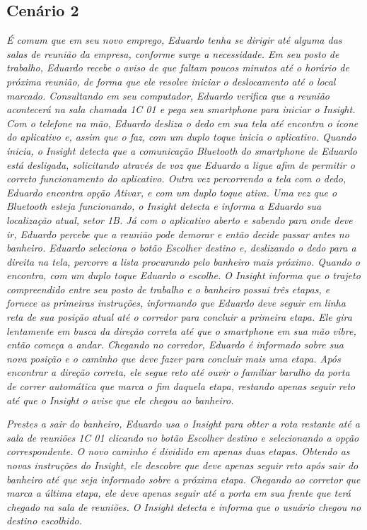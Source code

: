 \documentclass[twoside,english,brazilian]{UNISINOSartigo}
\begin{document}
\subsection{Cenário 2}
\textit{É comum que em seu novo emprego, Eduardo tenha se dirigir até alguma das salas de reunião da empresa, conforme surge a necessidade. Em seu posto de trabalho, Eduardo recebe o aviso de que faltam poucos minutos até o horário de próxima reunião, de forma que ele resolve iniciar o deslocamento até o local marcado. Consultando em seu computador, Eduardo verifica que a reunião acontecerá na sala chamada 1C 01 e pega seu smartphone para iniciar o Insight. Com o telefone na mão, Eduardo desliza o dedo em sua tela até encontra o ícone do aplicativo e, assim que o faz, com um duplo toque inicia o aplicativo. Quando inicia, o Insight detecta que a comunicação Bluetooth do smartphone de Eduardo está desligada, solicitando através de voz que Eduardo a ligue afim de permitir o correto funcionamento do aplicativo. Outra vez percorrendo a tela com o dedo, Eduardo encontra opção Ativar, e com um duplo toque ativa. Uma vez que o Bluetooth esteja funcionando, o Insight detecta e informa a Eduardo sua localização atual, setor 1B. Já com o aplicativo aberto e sabendo para onde deve ir, Eduardo percebe que a reunião pode demorar e então decide passar antes no banheiro. Eduardo seleciona o botão Escolher destino e, deslizando o dedo para a direita na tela, percorre a lista procurando pelo banheiro mais próximo. Quando o encontra, com um duplo toque Eduardo o escolhe. O Insight informa que o trajeto compreendido entre seu posto de trabalho e o banheiro possui três etapas, e fornece as primeiras instruções, informando que Eduardo deve seguir em linha reta de sua posição atual até o corredor para concluir a primeira etapa. Ele gira lentamente em busca da direção correta até que o smartphone em sua mão vibre, então começa a andar. Chegando no corredor, Eduardo é informado sobre sua nova posição e o caminho que deve fazer para concluir mais uma etapa. Após encontrar a direção correta, ele segue reto até ouvir o familiar barulho da porta de correr automática que marca o fim daquela etapa, restando apenas seguir reto até que o Insight o avise que ele chegou ao banheiro.}

\textit{Prestes a sair do banheiro, Eduardo usa o Insight para obter a rota restante até a sala de reuniões 1C 01 clicando no botão Escolher destino e selecionando a opção correspondente. O novo caminho é dividido em apenas duas etapas. Obtendo as novas instruções do Insight, ele descobre que deve apenas seguir reto após sair do banheiro até que seja informado sobre a próxima etapa. Chegando ao corretor que marca a última etapa, ele deve apenas seguir até a porta em sua frente que terá chegado na sala de reuniões. O Insight detecta e informa que o usuário chegou no destino escolhido.}
\end{document}
